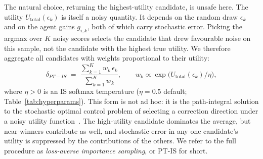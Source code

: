 \documentclass{article}
\begin{document}
The natural choice, returning the highest-utility candidate, is unsafe here. The utility $U_{\text{total}}(\epsilon_k)$ is itself a noisy quantity. It depends on the random draw $\epsilon_k$ and on the agent 
gains $g_{i,k}$, both of which carry stochastic error. Picking 
the argmax over $K$ noisy scores selects the candidate that drew 
favourable noise on this sample, not the candidate with the 
highest true utility. We therefore aggregate all candidates with weights 
proportional to their utility:
\begin{equation}
\delta_{PT-IS} \;=\; \frac{\sum_{k=1}^{K} w_k\,\epsilon_k}
                         {\sum_{k=1}^{K} w_k},
\qquad
w_k \propto \exp\!\bigl(U_{\text{total}}(\epsilon_k)/\eta\bigr),
\label{eq:pt-is-aggregation}
\end{equation}
where $\eta>0$ is an IS softmax temperature ($\eta{=}0.5$ default; Table~\ref{tab:hyperparams}). This form is not ad hoc: it is the path-integral solution to 
the stochastic optimal control problem of selecting a correction 
direction under a noisy utility 
function~\citep{williams2017mppi, levine2018reinforcement}. The 
high-utility candidate dominates the average, but near-winners 
contribute as well, and stochastic error in any one candidate's 
utility is suppressed by the contributions of the others. We 
refer to the full procedure as 
\emph{loss-averse importance sampling}, or PT-IS for short.


\end{document}
